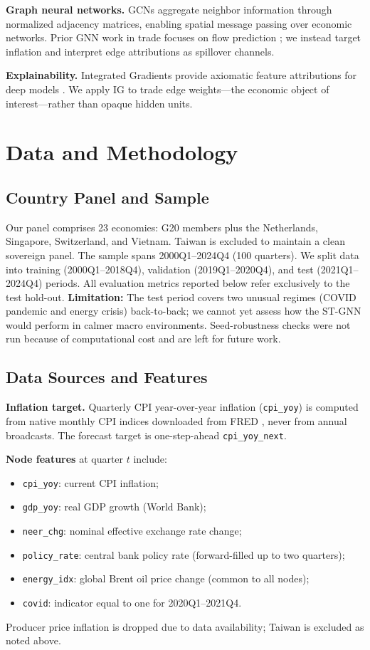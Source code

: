 \documentclass[12pt,a4paper]{article}
\begin{document}
\textbf{Graph neural networks.}
GCNs \citep{kipf2017semi} aggregate neighbor information through normalized adjacency matrices, enabling spatial message passing over economic networks.
Prior GNN work in trade focuses on flow prediction \citep{monken2021predicting}; we instead target inflation and interpret edge attributions as spillover channels.

\textbf{Explainability.}
Integrated Gradients provide axiomatic feature attributions for deep models \citep{sundararajan2017axiomatic}.
We apply IG to trade edge weights---the economic object of interest---rather than opaque hidden units.

\section{Data and Methodology}
\label{sec:methods}

\subsection{Country Panel and Sample}

Our panel comprises 23 economies: G20 members plus the Netherlands, Singapore, Switzerland, and Vietnam.
Taiwan is excluded to maintain a clean sovereign panel.
The sample spans 2000Q1--2024Q4 (100 quarters).
We split data into training (2000Q1--2018Q4), validation (2019Q1--2020Q4), and test (2021Q1--2024Q4) periods.
All evaluation metrics reported below refer exclusively to the test hold-out.
\textbf{Limitation:} The test period covers two unusual regimes (COVID pandemic and energy crisis) back-to-back; we cannot yet assess how the ST-GNN would perform in calmer macro environments.
Seed-robustness checks were not run because of computational cost and are left for future work.

\subsection{Data Sources and Features}

\textbf{Inflation target.}
Quarterly CPI year-over-year inflation (\texttt{cpi\_yoy}) is computed from native monthly CPI indices downloaded from FRED \citep{fred2026}, never from annual broadcasts.
The forecast target is one-step-ahead \texttt{cpi\_yoy\_next}.

\textbf{Node features} at quarter $t$ include:
\begin{itemize}
  \item \texttt{cpi\_yoy}: current CPI inflation;
  \item \texttt{gdp\_yoy}: real GDP growth (World Bank);
  \item \texttt{neer\_chg}: nominal effective exchange rate change;
  \item \texttt{policy\_rate}: central bank policy rate (forward-filled up to two quarters);
  \item \texttt{energy\_idx}: global Brent oil price change (common to all nodes);
  \item \texttt{covid}: indicator equal to one for 2020Q1--2021Q4.
\end{itemize}
Producer price inflation is dropped due to data availability; Taiwan is excluded as noted above.
\end{document}
